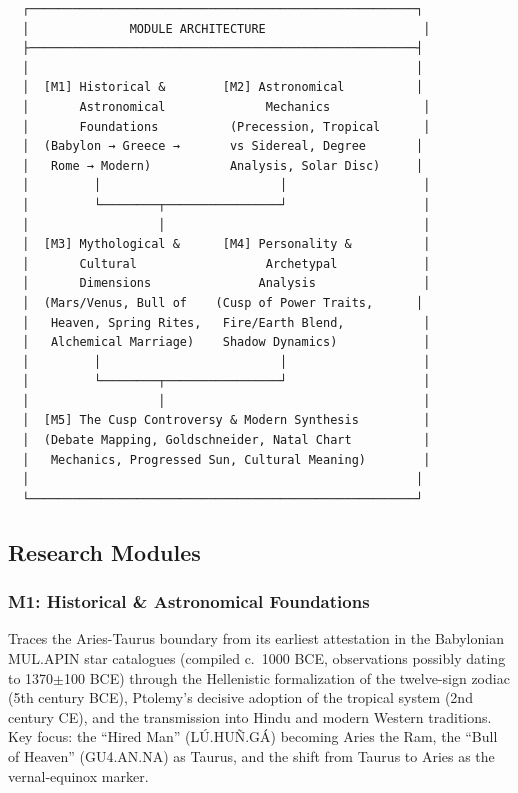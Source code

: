 \documentclass[11pt,letterpaper]{article}
\begin{document}
\begin{asciibox}
\begin{verbatim}
  ┌──────────────────────────────────────────────────────┐
  │              MODULE ARCHITECTURE                      │
  ├──────────────────────────────────────────────────────┤
  │                                                      │
  │  [M1] Historical &        [M2] Astronomical          │
  │       Astronomical              Mechanics             │
  │       Foundations          (Precession, Tropical      │
  │  (Babylon → Greece →       vs Sidereal, Degree       │
  │   Rome → Modern)           Analysis, Solar Disc)     │
  │         │                         │                   │
  │         └────────┬────────────────┘                   │
  │                  │                                    │
  │  [M3] Mythological &      [M4] Personality &          │
  │       Cultural                  Archetypal            │
  │       Dimensions               Analysis               │
  │  (Mars/Venus, Bull of    (Cusp of Power Traits,      │
  │   Heaven, Spring Rites,   Fire/Earth Blend,           │
  │   Alchemical Marriage)    Shadow Dynamics)            │
  │         │                         │                   │
  │         └────────┬────────────────┘                   │
  │                  │                                    │
  │  [M5] The Cusp Controversy & Modern Synthesis         │
  │  (Debate Mapping, Goldschneider, Natal Chart          │
  │   Mechanics, Progressed Sun, Cultural Meaning)        │
  │                                                      │
  └──────────────────────────────────────────────────────┘
\end{verbatim}
\end{asciibox}

\subsection{Research Modules}

\subsubsection{M1: Historical \& Astronomical Foundations}

Traces the Aries-Taurus boundary from its earliest attestation in the Babylonian MUL.APIN star catalogues (compiled c.\ 1000 BCE, observations possibly dating to 1370$\pm$100 BCE) through the Hellenistic formalization of the twelve-sign zodiac (5th century BCE), Ptolemy's decisive adoption of the tropical system (2nd century CE), and the transmission into Hindu and modern Western traditions. Key focus: the ``Hired Man'' (LÚ.HUÑ.GÁ) becoming Aries the Ram, the ``Bull of Heaven'' (GU4.AN.NA) as Taurus, and the shift from Taurus to Aries as the vernal-equinox marker.
\end{document}
